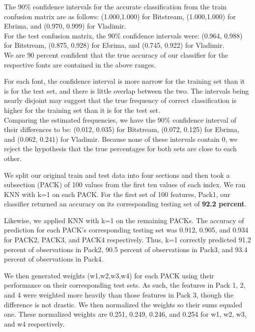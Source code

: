 \documentclass{homework}
\begin{document}
\question
The 90\% confidence intervals for the accurate classification from the train confusion matrix are as follows: (1.000,1.000) for Bitstream, (1.000,1.000) for  Ebrima, and (0.970, 0.999) for Vladimir.\\
For the test confusion matrix, the 90\% confidence intervals were:
(0.964, 0.988) for Bitstream, (0.875, 0.928) for Ebrima, and (0.745, 0.922) for Vladimir.\\ 
We are 90 percent confident that the true accuracy of our classifier for the respective fonts are contained in the above ranges.

For each font, the confidence interval is more narrow for the training set than it is for the test set, and there is little overlap between the two. The intervals being nearly disjoint may suggest that the true frequency of correct classification is higher for the training set than it is for the test set.\\ 
Comparing the estimated frequencies, we have the 90\% confidence interval of their differences to be: (0.012, 0.035) for Bitstream, (0.072, 0.125) for Ebrima, and (0.062, 0.241) for Vladimir. Because none of these intervals contain 0, we reject the hypothesis that the true percentages for both sets are close to each other.

\question
We split our original train and test data into four sections and then took a subsection (PACK) of 100 values from the first ten values of each index. We ran KNN with k=1 on each PACK. For the first set of 100 features, Pack1, our classifier returned an accuracy on its corresponding testing set of \textbf{92.2 percent}. 

\question
Likewise, we applied KNN with k=1 on the remaining PACKs. The accuracy of prediction for each PACK's corresponding testing set was 0.912, 0.905, and 0.934 for PACK2, PACK3, and PACK4 respectively. Thus, k=1 correctly predicted 91.2 percent of observations in Pack2, 90.5 percent of observations in Pack3, and 93.4 percent of observations in Pack4.

\question
We then generated weights (w1,w2,w3,w4) for each PACK using their performance on their corresponding test sets. As such, the features in Pack 1, 2, and 4 were weighted more heavily than those features in Pack 3, though the difference is not drastic. We then normalized the weights so their sums equaled one. These normalized weights are 0.251, 0.249, 0.246, and 0.254 for w1, w2, w3, and w4 respectively.
\end{document}
